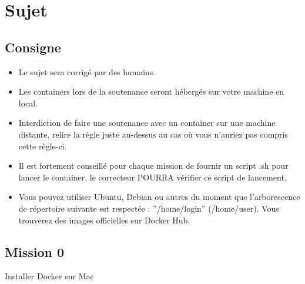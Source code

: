 \documentclass{42}
\begin{document}
	\newpage

\chapter{Sujet}

\section{Consigne}
\begin{itemize}
	\item Le sujet sera corrigé par des humains.
	\item Les containers lors de la soutenance seront hébergés sur votre machine en local.
	\item Interdiction de faire une soutenance avec un container sur une machine distante, relire la règle juste au-dessus au cas où vous n’auriez pas compris cette règle-ci.
	\item Il est fortement conseillé pour chaque mission de fournir un script .sh pour lancer le container, le correcteur POURRA vérifier ce script de lancement.
	\item Vous pouvez utiliser Ubuntu, Debian ou autres du moment que l'arborescence de répertoire suivante est respectée : ''/home/login'' (/home/user). Vous trouverez des images officielles sur Docker Hub.
\end{itemize}

	\newpage

\section{Mission 0}
\begin{center}
	{\Huge Installer Docker sur Mac}
\end{center}
\end{document}
